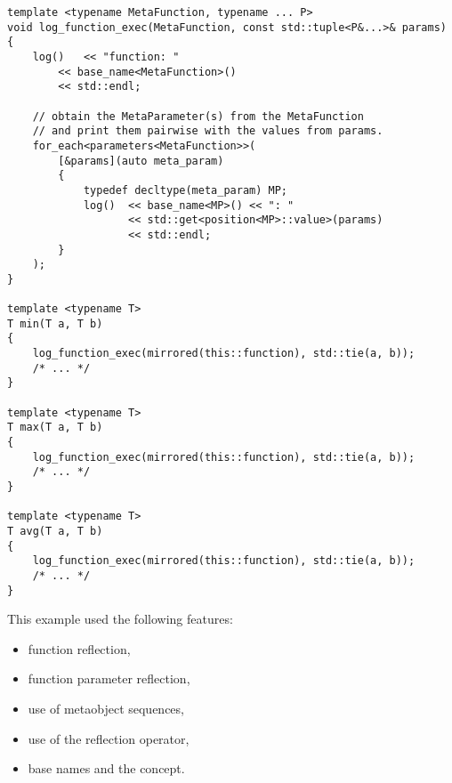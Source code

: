 \begin{verbatim}
template <typename MetaFunction, typename ... P>
void log_function_exec(MetaFunction, const std::tuple<P&...>& params)
{
	log()   << "function: "
		<< base_name<MetaFunction>()
		<< std::endl;

	// obtain the MetaParameter(s) from the MetaFunction
	// and print them pairwise with the values from params.
	for_each<parameters<MetaFunction>>(
		[&params](auto meta_param)
		{
			typedef decltype(meta_param) MP;
			log()  << base_name<MP>() << ": "
			       << std::get<position<MP>::value>(params)
			       << std::endl;
		}
	);
}

template <typename T>
T min(T a, T b)
{
	log_function_exec(mirrored(this::function), std::tie(a, b));
	/* ... */
}

template <typename T>
T max(T a, T b)
{
	log_function_exec(mirrored(this::function), std::tie(a, b));
	/* ... */
}

template <typename T>
T avg(T a, T b)
{
	log_function_exec(mirrored(this::function), std::tie(a, b));
	/* ... */
}
\end{verbatim}

This example used the following features:

\begin{itemize}
\item{function reflection,}
\item{function parameter reflection,}
\item{use of metaobject sequences,}
\item{use of the reflection operator,}
\item{base names and the  concept.}
\end{itemize}
